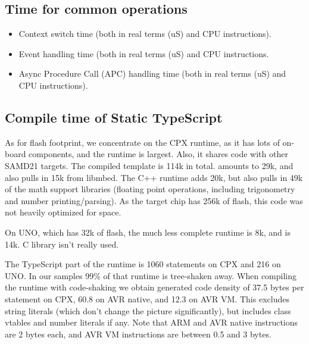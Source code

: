 \subsection{Time for common \CO operations}

\begin{itemize}
\item Context switch time (both in real terms (uS) and CPU instructions). 
\item Event handling time (both in real terms (uS) and CPU instructions. 
\item Async Procedure Call (APC) handling time (both in real terms (uS) and CPU instructions). 
\end{itemize}

\subsection{Compile time of Static TypeScript}

As for flash footprint, we concentrate on the CPX runtime, as it has lots of on-board
components, and the runtime is largest. Also, it shares code with other
SAMD21 \MC targets.
The compiled template is 114k in total. \CO amounts to 29k, and also pulls
in 15k from libmbed. The \MC C++ runtime adds 20k, but also pulls in
49k of the math support libraries (floating point operations,
including trigonometry and number printing/parsing).
As the target chip has 256k of flash, this code was not heavily optimized for space.

On UNO, which has 32k of flash, the much less complete \MC runtime is 8k, and \CO
is 14k. C library isn't really used.

The TypeScript part of the runtime is 1060 statements on CPX and 216 on UNO.
In our samples 99\% of that runtime is tree-shaken away.
When compiling the runtime with code-shaking we obtain generated code density of 
37.5 bytes per statement on CPX, 60.8 on AVR native, and 12.3 on AVR VM.
This excludes string literals (which don't change the picture significantly), but includes class vtables and number literals
if any. Note that ARM and AVR native instructions are 2 bytes each, and AVR VM
instructions are between 0.5 and 3 bytes.


